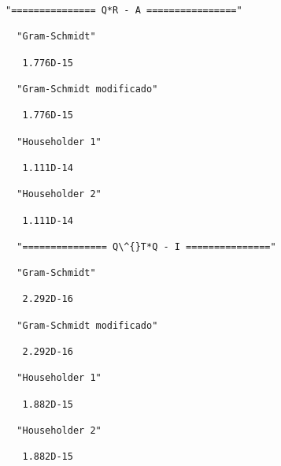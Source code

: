 \documentclass[11pt]{article}
\begin{document}
    \begin{Verbatim}[commandchars=\\\{\}]
  "=============== Q*R - A ================"

  "Gram-Schmidt"

   1.776D-15

  "Gram-Schmidt modificado"

   1.776D-15

  "Householder 1"

   1.111D-14

  "Householder 2"

   1.111D-14

  "=============== Q\^{}T*Q - I ==============="

  "Gram-Schmidt"

   2.292D-16

  "Gram-Schmidt modificado"

   2.292D-16

  "Householder 1"

   1.882D-15

  "Householder 2"

   1.882D-15
    \end{Verbatim}
\end{document}
